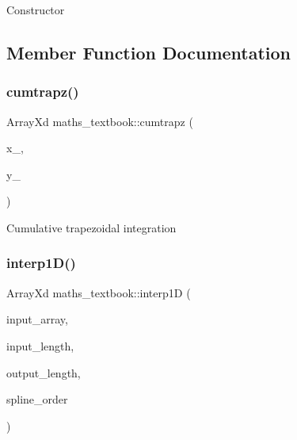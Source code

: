 Constructor 

\subsection{Member Function Documentation}
\mbox{\label{classmaths__textbook_ae893700d202ab9a84e33974f9ca42da3}} 
\subsubsection{\texorpdfstring{cumtrapz()}{cumtrapz()}}
{\footnotesize\ttfamily Array\+Xd maths\+\_\+textbook\+::cumtrapz (\begin{DoxyParamCaption}\item[{Array\+Xd}]{x\+\_\+,  }\item[{Array\+Xd}]{y\+\_\+ }\end{DoxyParamCaption})}

Cumulative trapezoidal integration \mbox{\label{classmaths__textbook_a803caea252953788b96a898a3bab9bd0}} 
\subsubsection{\texorpdfstring{interp1\+D()}{interp1D()}\hspace{0.1cm}{\footnotesize\ttfamily [1/2]}}
{\footnotesize\ttfamily Array\+Xd maths\+\_\+textbook\+::interp1D (\begin{DoxyParamCaption}\item[{Array\+Xd}]{input\+\_\+array,  }\item[{int}]{input\+\_\+length,  }\item[{int}]{output\+\_\+length,  }\item[{int}]{spline\+\_\+order }\end{DoxyParamCaption})}

\mbox{\label{classmaths__textbook_ac4789e1e67a597303faab6cc5fa889ec}} 

